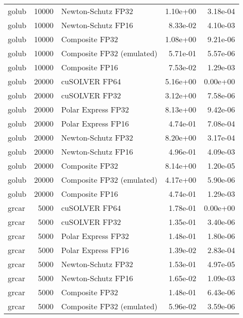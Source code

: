 \begin{table}
\begin{tabular}{lrlrr}
    golub & 10000 &        Newton-Schutz FP32 &  1.10e+00 &        3.18e-04 \\
    golub & 10000 &        Newton-Schutz FP16 &  8.33e-02 &        4.10e-03 \\
    golub & 10000 &            Composite FP32 &  1.08e+00 &        9.21e-06 \\
    golub & 10000 & Composite FP32 (emulated) &  5.71e-01 &        5.57e-06 \\
    golub & 10000 &            Composite FP16 &  7.53e-02 &        1.29e-03 \\
    golub & 20000 &             cuSOLVER FP64 &  5.16e+00 &        0.00e+00 \\
    golub & 20000 &             cuSOLVER FP32 &  3.12e+00 &        7.58e-06 \\
    golub & 20000 &        Polar Express FP32 &  8.13e+00 &        9.42e-06 \\
    golub & 20000 &        Polar Express FP16 &  4.74e-01 &        7.08e-04 \\
    golub & 20000 &        Newton-Schutz FP32 &  8.20e+00 &        3.17e-04 \\
    golub & 20000 &        Newton-Schutz FP16 &  4.96e-01 &        4.09e-03 \\
    golub & 20000 &            Composite FP32 &  8.14e+00 &        1.20e-05 \\
    golub & 20000 & Composite FP32 (emulated) &  4.17e+00 &        5.90e-06 \\
    golub & 20000 &            Composite FP16 &  4.74e-01 &        1.29e-03 \\
    grcar &  5000 &             cuSOLVER FP64 &  1.78e-01 &        0.00e+00 \\
    grcar &  5000 &             cuSOLVER FP32 &  1.35e-01 &        3.40e-06 \\
    grcar &  5000 &        Polar Express FP32 &  1.48e-01 &        1.80e-06 \\
    grcar &  5000 &        Polar Express FP16 &  1.39e-02 &        2.83e-04 \\
    grcar &  5000 &        Newton-Schutz FP32 &  1.53e-01 &        4.97e-05 \\
    grcar &  5000 &        Newton-Schutz FP16 &  1.65e-02 &        1.09e-03 \\
    grcar &  5000 &            Composite FP32 &  1.48e-01 &        6.43e-06 \\
    grcar &  5000 & Composite FP32 (emulated) &  5.96e-02 &        3.59e-06 \\

\end{tabular}
\end{table}
